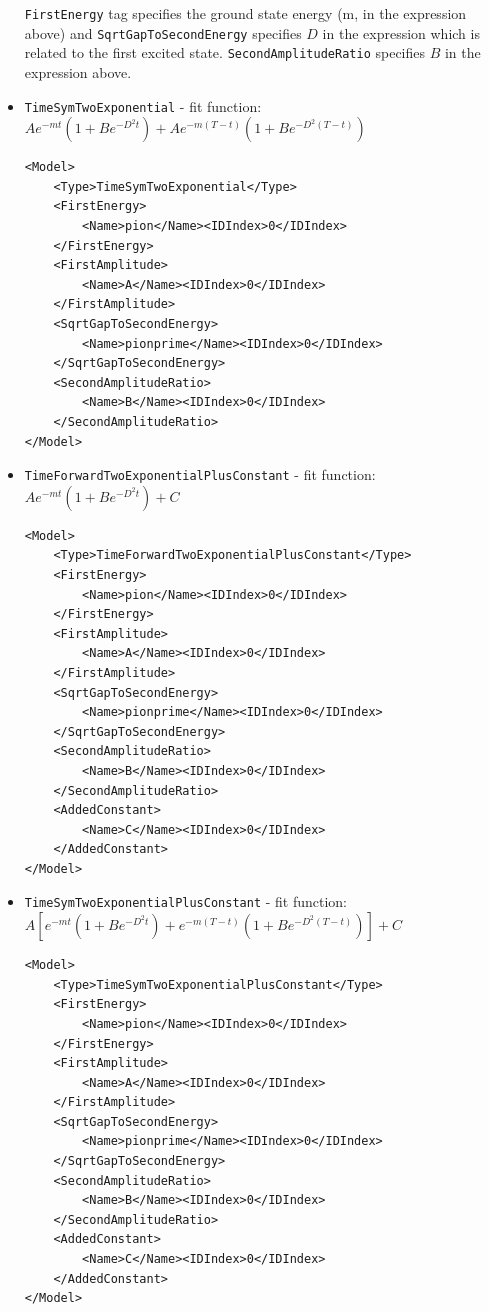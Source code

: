 \documentclass[12pt]{article}
\newcommand{\vb}{\texttt}
\begin{document}
\begin{itemize}
\vb{FirstEnergy} tag specifies the ground state energy (m, in the expression above) and
\vb{SqrtGapToSecondEnergy} specifies $D$ in the expression which is related to the first excited state.
\vb{SecondAmplitudeRatio} specifies $B$ in the expression above.

\item \vb{TimeSymTwoExponential} - fit function:\\
  $A e^{-mt}(1 + B e^{-D^2t}) + Ae^{-m(T-t)}(1 + B e^{-D^2(T-t)})$
\begin{verbatim}
<Model>
    <Type>TimeSymTwoExponential</Type>
    <FirstEnergy>
        <Name>pion</Name><IDIndex>0</IDIndex>
    </FirstEnergy>
    <FirstAmplitude>
        <Name>A</Name><IDIndex>0</IDIndex>
    </FirstAmplitude>
    <SqrtGapToSecondEnergy>
        <Name>pionprime</Name><IDIndex>0</IDIndex>
    </SqrtGapToSecondEnergy>
    <SecondAmplitudeRatio>
        <Name>B</Name><IDIndex>0</IDIndex>
    </SecondAmplitudeRatio>
</Model>
\end{verbatim}

\item \vb{TimeForwardTwoExponentialPlusConstant} - fit function:
  $A e^{-mt}(1 + B e^{-D^2t}) + C$
\begin{verbatim}
<Model>
    <Type>TimeForwardTwoExponentialPlusConstant</Type>
    <FirstEnergy>
        <Name>pion</Name><IDIndex>0</IDIndex>
    </FirstEnergy>
    <FirstAmplitude>
        <Name>A</Name><IDIndex>0</IDIndex>
    </FirstAmplitude>
    <SqrtGapToSecondEnergy>
        <Name>pionprime</Name><IDIndex>0</IDIndex>
    </SqrtGapToSecondEnergy>
    <SecondAmplitudeRatio>
        <Name>B</Name><IDIndex>0</IDIndex>
    </SecondAmplitudeRatio>
    <AddedConstant>
        <Name>C</Name><IDIndex>0</IDIndex>
    </AddedConstant>
</Model>
\end{verbatim}

\item \vb{TimeSymTwoExponentialPlusConstant} - fit function:\\
  $A[e^{-mt}(1 + B e^{-D^2t} ) + e^{-m(T-t)}(1 + B e^{-D^2(T-t)})] + C$
\begin{verbatim}
<Model>
    <Type>TimeSymTwoExponentialPlusConstant</Type>
    <FirstEnergy>
        <Name>pion</Name><IDIndex>0</IDIndex>
    </FirstEnergy>
    <FirstAmplitude>
        <Name>A</Name><IDIndex>0</IDIndex>
    </FirstAmplitude>
    <SqrtGapToSecondEnergy>
        <Name>pionprime</Name><IDIndex>0</IDIndex>
    </SqrtGapToSecondEnergy>
    <SecondAmplitudeRatio>
        <Name>B</Name><IDIndex>0</IDIndex>
    </SecondAmplitudeRatio>
    <AddedConstant>
        <Name>C</Name><IDIndex>0</IDIndex>
    </AddedConstant>
</Model>
\end{verbatim}


\end{itemize}
\end{document}
